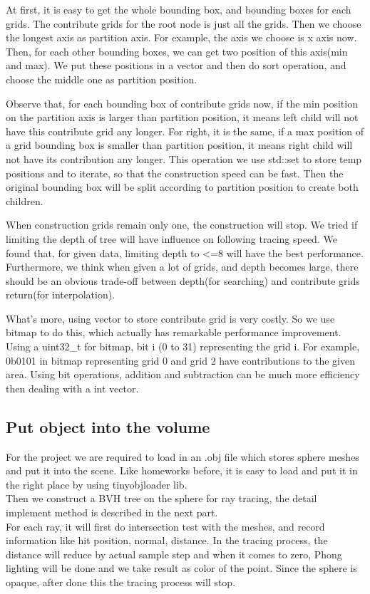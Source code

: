 \documentclass[acmtog]{acmart}
\begin{document}
At first, it is easy to get the whole bounding box, and bounding boxes for each grids. The contribute grids for the root node is just all the grids. Then we choose the longest axis as partition axis. For example, the axis we choose is x axis now. Then, for each other bounding boxes, we can get two position of this axis(min and max). We put these positions in a vector and then do sort operation, and choose the middle one as partition position.


Observe that, for each bounding box of contribute grids now, if the min position on the partition axis is larger than partition position, it means left child will not have this contribute grid any longer. For right, it is the same, if a max position of a grid bounding box is smaller than partition position, it means right child will not have its contribution any longer. This operation we use std::set to store temp positions and to iterate, so that the construction speed can be fast. Then the original bounding box will be split according to partition position to create both children.


When construction grids remain only one, the construction will stop. We tried if limiting the depth of tree will have influence on following tracing speed. We found that, for given data, limiting depth to <=8 will have the best performance. Furthermore, we think when given a lot of grids, and depth becomes large, there should be an obvious trade-off between depth(for searching) and contribute grids return(for interpolation).


What's more, using vector to store contribute grid is very costly. So we use bitmap to do this, which actually has remarkable performance improvement. Using a uint32\_t for bitmap, bit i (0 to 31) representing the grid i. For example, 0b0101 in bitmap representing grid 0 and grid 2 have contributions to the given area. Using bit operations, addition and subtraction can be much more efficiency then dealing with a int vector.


\subsection{Put object into the volume}


For the project we are required to load in an .obj file which stores sphere meshes and put it into the scene. Like homeworks before, it is easy to load and put it in the right place by using tinyobjloader lib.\\
Then we construct a BVH tree on the sphere for ray tracing, the detail implement method is described in the next part.\\
For each ray, it will first do intersection test with the meshes, and record information like hit position, normal, distance. In the tracing process, the distance will reduce by actual sample step and when it comes to zero, Phong lighting will be done and we take result as color of the point. Since the sphere is opaque, after done this the tracing process will stop.
\end{document}
